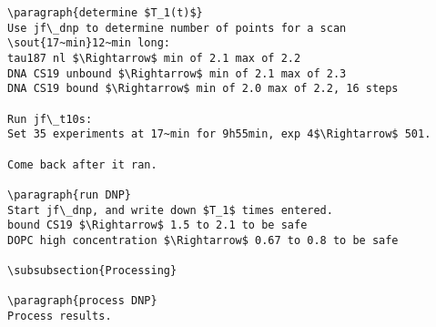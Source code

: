 \begin{scriptsize}
\begin{python}[off]
\begin{scriptsize}
\begin{lstlisting}
\paragraph{determine $T_1(t)$}
Use jf\_dnp to determine number of points for a scan \sout{17~min}12~min long:
tau187 nl $\Rightarrow$ min of 2.1 max of 2.2
DNA CS19 unbound $\Rightarrow$ min of 2.1 max of 2.3
DNA CS19 bound $\Rightarrow$ min of 2.0 max of 2.2, 16 steps

Run jf\_t10s:
Set 35 experiments at 17~min for 9h55min, exp 4$\Rightarrow$ 501.

Come back after it ran.

\paragraph{run DNP}
Start jf\_dnp, and write down $T_1$ times entered.
bound CS19 $\Rightarrow$ 1.5 to 2.1 to be safe
DOPC high concentration $\Rightarrow$ 0.67 to 0.8 to be safe

\subsubsection{Processing}

\paragraph{process DNP}
Process results.



\end{lstlisting}
\end{scriptsize}
\end{python}
\end{scriptsize}
